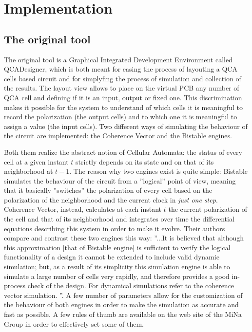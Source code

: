 \chapter{Implementation}\label{sec:implementation}
\section {The original tool}
The original tool is a Graphical Integrated Development Environment called QCADesigner, which is both meant for easing the process of layouting a QCA cells based circuit and for simplyfing the process of simulation and collection of the results. The layout view allows to place on the virtual PCB any number of QCA cell and defining if it is an input, output or fixed one. This discrimination makes it possible for the system to understand of which cells it is meaningful to record the polarization (the output cells) and to which one it is meaningful to assign a value (the input cells). Two different ways of simulating the behaviour of the circuit are implemented: the Coherence Vector and the Bistable engines. 

Both them realize the abstract notion of Cellular Automata: the status of every cell at a given instant $t$ strictly depends on its state and on that of its neighborhood at $t-1$. The reason why two engines exist is quite simple: Bistable simulates the behaviour of the circuit from a ''logical'' point of view, meaning that it basically ''switches'' the polarization of every cell based on the polarization of the neighborhood and the current clock in \textsl{just one step}. Coherence Vector, instead, calculates at each instant $t$ the current polarization of the cell and that of its neighborhood and integrates over time the differential equations describing this system in order to make it evolve. Their authors compare and contrast these two engines this way: ''...It is believed that although this approximation [that of Bistable engine] is sufficient to verify the logical functionality of a design it cannot be extended to include valid dynamic simulation; but, as a result of its simplicity this simulation engine is able to simulate a large number of cells very rapidly, and therefore provides a good in-process check of the design. For dynamical simulations refer to the coherence vector simulation. ''. A few number of parameters allow for the customization of the behaviour of both engines in order to make the simulation as accurate and fast as possible. A few rules of thumb are available on the web site of the MiNa Group in order to effectively set some of them.

